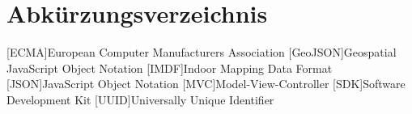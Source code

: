 \chapter*{Abkürzungsverzeichnis}

\begin{acronym}
	[ECMA]{European Computer Manufacturers Association}
	[GeoJSON]{Geospatial JavaScript Object Notation}
	[IMDF]{Indoor Mapping Data Format}
	[JSON]{JavaScript Object Notation}
	[MVC]{Model-View-Controller}
	[SDK]{Software Development Kit}
	[UUID]{Universally Unique Identifier}
\end{acronym}

\clearpage
